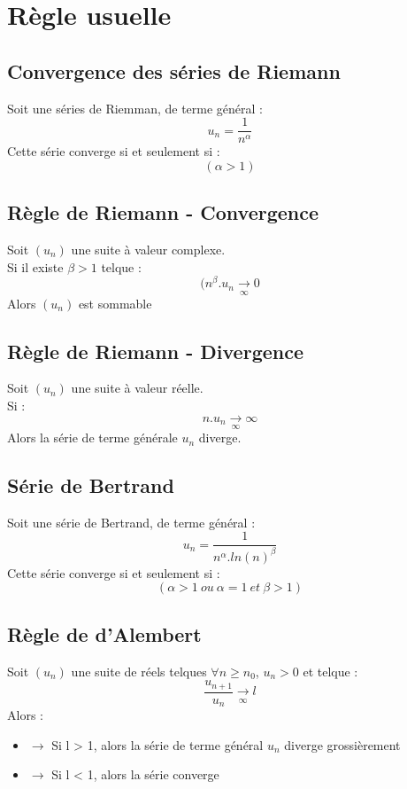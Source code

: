 \documentclass[a4paper,12 pt,oneside]{report}     %
\begin{document}
\section{Règle usuelle}
\subsection{Convergence des séries de Riemann}
Soit une séries de Riemman, de terme général :
$$u_n  = \dfrac{1}{n^{\alpha}}$$
Cette série converge si et seulement si :
$$(\alpha > 1)$$
\subsection{Règle de Riemann - Convergence}
Soit $(u_n)$ une suite à valeur complexe.\\
Si il existe $\beta > 1$ telque :
$$(n^{\beta}.u_n \underset{\infty}\rightarrow 0$$
Alors $(u_n)$ est sommable
\subsection{Règle de Riemann - Divergence}
Soit $(u_n)$ une suite à valeur réelle.\\
Si : 
$$n.u_n \underset{\infty}\rightarrow \infty $$
Alors la série de terme générale $u_n$ diverge.
\subsection{Série de Bertrand}
Soit une série de Bertrand, de terme général :
$$u_n = \dfrac{1}{n^{\alpha}.ln(n)^{\beta}}$$
Cette série converge si et seulement si : 
$$(\alpha > 1~ ou~ \alpha=1~ et~ \beta>1)$$
\subsection{Règle de d'Alembert}
Soit $(u_n)$ une suite de réels telques $\forall n \geq n_0$, $u_n>0$ et telque : 
$$\dfrac{u_{n+1}}{u_n} \underset{\infty}\rightarrow l$$
Alors :
\begin{itemize}
 \item{$\rightarrow$} Si l > 1, alors la série de terme général $u_n$ diverge grossièrement
 \item{$\rightarrow$} Si l < 1, alors la série converge
\end{itemize}
\end{document}
